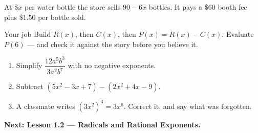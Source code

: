 \documentclass[aspectratio=169, 11pt]{beamer}
\begin{document}
\begin{frame}[t, plain]
  At \$$x$ per water bottle the store sells $90-6x$ bottles. It pays a \$60 booth fee plus
  \$1.50 per bottle sold.
  \begin{block}{Your job}
    Build $R(x)$, then $C(x)$, then $P(x)=R(x)-C(x)$. Evaluate $P(6)$ --- and check it against
    the story before you believe it.
  \end{block}
\end{frame}

\begin{frame}[t, plain]
  \begin{enumerate}
    \setlength{\itemsep}{0.35cm}
    \item Simplify $\dfrac{12a^5b^3}{3a^2b^7}$ with no negative exponents.
    \item Subtract $\left(5x^2-3x+7\right)-\left(2x^2+4x-9\right)$.
    \item A classmate writes $\left(3x^2\right)^3=3x^6$. Correct it, and say what was forgotten.
  \end{enumerate}
  \vspace{0.3cm}
  {\color{royal}\bfseries Next: Lesson 1.2 --- Radicals and Rational Exponents.}
\end{frame}
\end{document}
